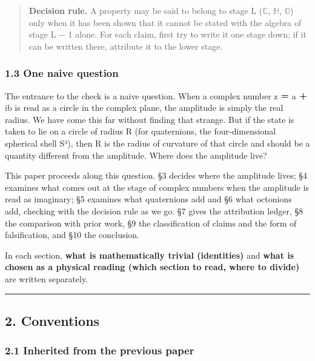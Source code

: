\documentclass[
  a4paper,
]{article}
\begin{document}
\begin{quote}
\textbf{Decision rule.} A property may be said to belong to stage L
(\(\mathbb{C}\), \(\mathbb{H}\), \(\mathbb{O}\)) only when it has been
shown that it cannot be stated with the algebra of stage L − 1 alone.
For each claim, first try to write it one stage down; if it can be
written there, attribute it to the lower stage.
\end{quote}

\subsubsection{1.3 One naive question}\label{one-naive-question}

The entrance to the check is a naive question. When a complex number z
＝ a ＋ ib is read as a circle in the complex plane, the amplitude is
simply the real radius. We have come this far without finding that
strange. But if the state is taken to lie on a circle of radius R (for
quaternions, the four-dimensional spherical shell S³), then R is the
radius of curvature of that circle and should be a quantity different
from the amplitude. Where does the amplitude live?

This paper proceeds along this question. §3 decides where the amplitude
lives; §4 examines what comes out at the stage of complex numbers when
the amplitude is read as imaginary; §5 examines what quaternions add and
§6 what octonions add, checking with the decision rule as we go. §7
gives the attribution ledger, §8 the comparison with prior work, §9 the
classification of claims and the form of falsification, and §10 the
conclusion.

In each section, \textbf{what is mathematically trivial (identities)}
and \textbf{what is chosen as a physical reading (which section to read,
where to divide)} are written separately.

\begin{center}\rule{0.5\linewidth}{0.5pt}\end{center}

\subsection{2. Conventions}\label{conventions}

\subsubsection{2.1 Inherited from the previous
paper}\label{inherited-from-the-previous-paper}
\end{document}
